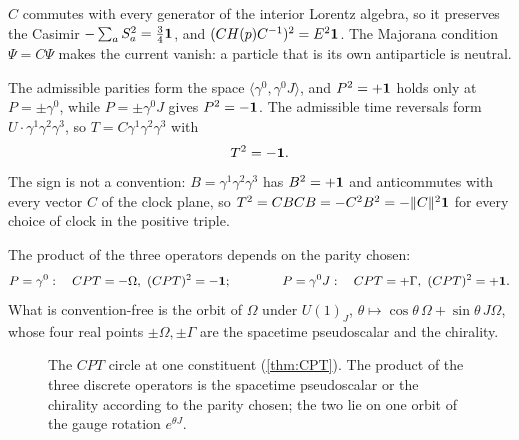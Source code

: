 \begin{corollary}
$C$ commutes with every generator of the interior Lorentz algebra, so it preserves the Casimir $-\sum_aS_a^2=\tfrac34\mathbf 1$, and
$(CH(p)C^{-1})^2=E^2\mathbf 1$. The Majorana condition $\Psi=C\Psi$ makes the current vanish: a particle that is its own antiparticle is
neutral.
\end{corollary}

\begin{theorem}
\label{thm:PT}
The admissible parities form the space $\langle\gamma^0,\gamma^0J\rangle$, and $P^2=+\mathbf 1$ holds only at $P=\pm\gamma^0$, while $P=\pm\gamma^0J$
gives $P^2=-\mathbf 1$. The admissible time reversals form $U\cdot\gamma^1\gamma^2\gamma^3$, so $T=C\gamma^1\gamma^2\gamma^3$ with
\[
T^2=-\mathbf 1 .
\]
The sign is not a convention: $B=\gamma^1\gamma^2\gamma^3$ has $B^2=+\mathbf 1$ and anticommutes with every vector $C$ of the clock plane, so
$T^2=CBCB=-C^2B^2=-\|C\|^2\mathbf 1$ for every choice of clock in the positive triple.
\end{theorem}

\begin{theorem}
\label{thm:CPT}
The product of the three operators depends on the parity chosen:
\[
P=\gamma^0:\quad CPT=-\Omega,\ (CPT)^2=-\id;\qquad\qquad P=\gamma^0J:\quad CPT=+\Gamma,\ (CPT)^2=+\id .
\]
What is convention-free is the orbit of $\Omega$ under $U(1)_J$, $\theta\mapsto\cos\theta\,\Omega+\sin\theta\,J\Omega$, whose four real points
$\pm\Omega,\pm\Gamma$ are the spacetime pseudoscalar and the chirality.
\end{theorem}

\begin{figure}[t]
\centering
{}
\caption{The $CPT$ circle at one constituent (\cref{thm:CPT}). The product of the three discrete operators is the spacetime
pseudoscalar or the chirality according to the parity chosen; the two lie on one orbit of the gauge rotation $e^{\theta J}$.}
\label{fig:cpt}
\end{figure}

